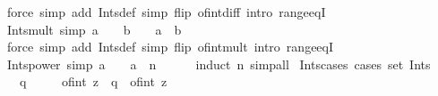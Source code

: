 \begin{isabellebody}
\isamarkupfalse%
\ {\isacharparenleft}{\kern0pt}force\ simp\ add{\isacharcolon}{\kern0pt}\ Ints{\isacharunderscore}{\kern0pt}def\ simp\ flip{\isacharcolon}{\kern0pt}\ of{\isacharunderscore}{\kern0pt}int{\isacharunderscore}{\kern0pt}diff\ intro{\isacharcolon}{\kern0pt}\ range{\isacharunderscore}{\kern0pt}eqI{\isacharparenright}{\kern0pt}%
\endisatagproof
{\isafoldproof}%
%
\isadelimproof
\isanewline
%
\endisadelimproof
\isanewline
{}\isamarkupfalse%
\ Ints{\isacharunderscore}{\kern0pt}mult\ {\isacharbrackleft}{\kern0pt}simp{\isacharbrackright}{\kern0pt}{\isacharcolon}{\kern0pt}\ {\isachardoublequoteopen}a\ {\isasymin}\ {\isasymint}\ {\isasymLongrightarrow}\ b\ {\isasymin}\ {\isasymint}\ {\isasymLongrightarrow}\ a\ {\isacharasterisk}{\kern0pt}\ b\ {\isasymin}\ {\isasymint}{\isachardoublequoteclose}\isanewline
%
\isadelimproof
\ \ %
\endisadelimproof
%
\isatagproof
{}\isamarkupfalse%
\ {\isacharparenleft}{\kern0pt}force\ simp\ add{\isacharcolon}{\kern0pt}\ Ints{\isacharunderscore}{\kern0pt}def\ simp\ flip{\isacharcolon}{\kern0pt}\ of{\isacharunderscore}{\kern0pt}int{\isacharunderscore}{\kern0pt}mult\ intro{\isacharcolon}{\kern0pt}\ range{\isacharunderscore}{\kern0pt}eqI{\isacharparenright}{\kern0pt}%
\endisatagproof
{\isafoldproof}%
%
\isadelimproof
\isanewline
%
\endisadelimproof
\isanewline
{}\isamarkupfalse%
\ Ints{\isacharunderscore}{\kern0pt}power\ {\isacharbrackleft}{\kern0pt}simp{\isacharbrackright}{\kern0pt}{\isacharcolon}{\kern0pt}\ {\isachardoublequoteopen}a\ {\isasymin}\ {\isasymint}\ {\isasymLongrightarrow}\ a\ {\isacharcircum}{\kern0pt}\ n\ {\isasymin}\ {\isasymint}{\isachardoublequoteclose}\isanewline
%
\isadelimproof
\ \ %
\endisadelimproof
%
\isatagproof
{}\isamarkupfalse%
\ {\isacharparenleft}{\kern0pt}induct\ n{\isacharparenright}{\kern0pt}\ simp{\isacharunderscore}{\kern0pt}all%
\endisatagproof
{\isafoldproof}%
%
\isadelimproof
\isanewline
%
\endisadelimproof
\isanewline
{}\isamarkupfalse%
\ Ints{\isacharunderscore}{\kern0pt}cases\ {\isacharbrackleft}{\kern0pt}cases\ set{\isacharcolon}{\kern0pt}\ Ints{\isacharbrackright}{\kern0pt}{\isacharcolon}{\kern0pt}\isanewline
\ \ \ {\isachardoublequoteopen}q\ {\isasymin}\ {\isasymint}{\isachardoublequoteclose}\isanewline
\ \ \ {\isacharparenleft}{\kern0pt}of{\isacharunderscore}{\kern0pt}int{\isacharparenright}{\kern0pt}\ z\ \ {\isachardoublequoteopen}q\ {\isacharequal}{\kern0pt}\ of{\isacharunderscore}{\kern0pt}int\ z{\isachardoublequoteclose}\isanewline

\end{isabellebody}
